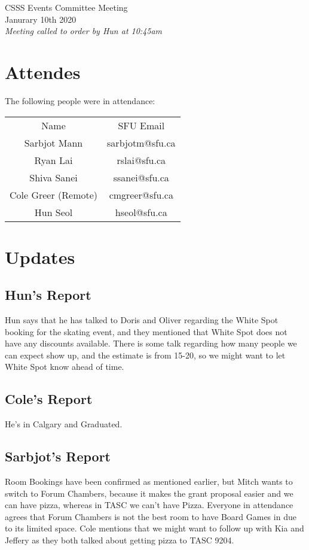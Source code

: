 \documentclass[12pt]{article}
\begin{document}
\begin{center}
CSSS Events Committee Meeting \\
Janurary 10th 2020 \\
\em Meeting called to order by Hun at 10:45am
\end{center}
\tableofcontents
\thispagestyle{empty}
\clearpage
{} 

\newpage 
\section{Attendes} \label{sec:Introduction}
The following people were in attendance: 
\begin{table}[h]
\centering
\begin{tabular}{cc}
Name                   & SFU Email             \\
Sarbjot Mann           & sarbjotm@sfu.ca       \\
Ryan Lai            & rslai@sfu.ca        \\
Shiva Sanei           & ssanei@sfu.ca          \\
Cole Greer  (Remote)        & cmgreer@sfu.ca       \\
Hun Seol & hseol@sfu.ca  
\end{tabular}
\end{table}

\section{Updates} \label{sec:Updates}

\subsection{Hun's Report}
\noindent Hun says that he has talked to Doris and Oliver regarding the White Spot booking for the skating event, and they mentioned that White Spot does not have any discounts available.  There is some talk regarding how many people we can expect show up, and the estimate is from 15-20, so we might want to let White Spot know ahead of time.

\subsection{Cole's Report}
\noindent He's in Calgary and Graduated.

\subsection{Sarbjot's Report}
Room Bookings have been confirmed as mentioned earlier, but Mitch wants to switch to Forum Chambers, because it makes the grant proposal easier and we can have pizza, whereas in TASC we can't have Pizza. Everyone in attendance agrees that Forum Chambers is not the best room to have Board Games in due to its limited space. Cole mentions that we might want to follow up with Kia and Jeffery as they both talked about getting pizza to TASC 9204.
\end{document}
